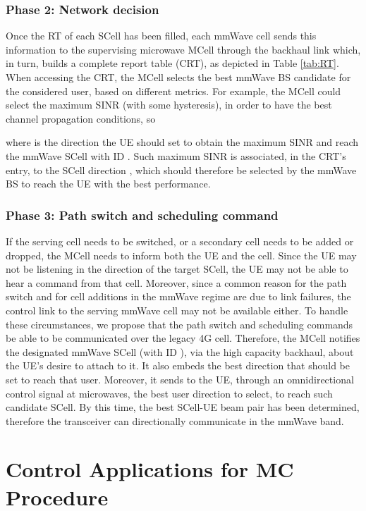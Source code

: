 \documentclass[conference,a4paper]{IEEEtran}
\begin{document}
\subsubsection{Phase 2:  Network decision}
Once the RT of each SCell has been filled, each mmWave cell sends 
this information to the supervising microwave MCell through the backhaul link which, in turn, builds a complete report table (CRT), as depicted in Table \ref{tab:RT}.
When accessing the CRT, the MCell  selects the best mmWave BS candidate for the considered user, based on different metrics. For example, the MCell could select the maximum SINR
(with some hysteresis), in order to have the best channel propagation conditions, so

where  is the direction the UE should set to obtain the maximum SINR and reach the mmWave SCell with ID .
Such maximum SINR is associated, in the CRT's entry, to the SCell direction , which should therefore be selected by the mmWave BS to reach the UE with the best  performance.

\subsubsection{Phase 3:  Path switch and scheduling command}
If the serving cell needs to be switched, or a secondary cell needs to be added or dropped,
 the MCell needs to inform both the UE and the cell.
Since the UE may not be listening in the direction of the target SCell,
the UE may not be able to hear a command from that cell.  Moreover, since a common reason for
the path switch and for cell additions in the mmWave regime 
are due to link failures, the control link to the serving mmWave cell may not be available either.
To handle these circumstances, we propose that the path switch and scheduling commands
be able to be communicated over the legacy 4G cell.  Therefore, the MCell notifies  the designated mmWave SCell (with ID ), via the high capacity backhaul,  about the UE's desire to attach to it. It also embeds the best direction  that should be set to reach that user. Moreover, it sends to the UE, through an omnidirectional control signal at microwaves, the best user direction  to select, to reach such candidate SCell. By this time, the best SCell-UE beam pair has been determined, therefore the transceiver can directionally communicate in the mmWave band.





\section{Control Applications for MC Procedure}
\label{sec:hints}
\end{document}
